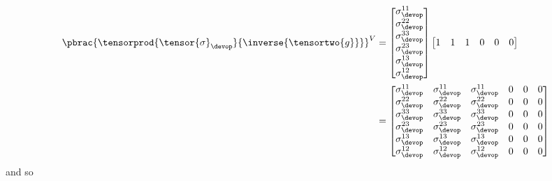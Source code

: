 \begin{equation}
  \begin{split}
    \pbrac{\tensorprod{\tensor{\sigma}_{\devop}}{\inverse{\tensortwo{g}}}}^{V}&=\begin{bmatrix}
    \sigma_{\devop}^{11} \\
    \sigma_{\devop}^{22} \\
    \sigma_{\devop}^{33} \\
    \sigma_{\devop}^{23} \\
    \sigma_{\devop}^{13} \\
    \sigma_{\devop}^{12}
    \end{bmatrix}\begin{bmatrix}
      1 & 1 & 1 & 0 & 0 & 0
    \end{bmatrix}\\
    &=\begin{bmatrix}
    \sigma_{\devop}^{11} & \sigma_{\devop}^{11} & \sigma_{\devop}^{11} & 0 & 0 & 0\\
    \sigma_{\devop}^{22} & \sigma_{\devop}^{22} & \sigma_{\devop}^{22} & 0 & 0 & 0\\
    \sigma_{\devop}^{33} & \sigma_{\devop}^{33} & \sigma_{\devop}^{33} & 0 & 0 & 0\\
    \sigma_{\devop}^{23} & \sigma_{\devop}^{23} & \sigma_{\devop}^{23} & 0 & 0 & 0\\
    \sigma_{\devop}^{13} & \sigma_{\devop}^{13} & \sigma_{\devop}^{13} & 0 & 0 & 0\\
    \sigma_{\devop}^{12} & \sigma_{\devop}^{12} & \sigma_{\devop}^{12} & 0 & 0 & 0
    \end{bmatrix}
  \end{split}
\end{equation}
and so
